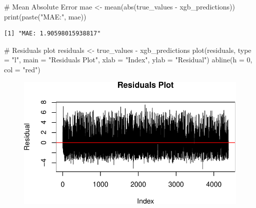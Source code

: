 \documentclass[
  super,
  preprint,
  3p]{elsarticle}
\newenvironment{Shaded}{\begin{snugshade}}{\end{snugshade}}
\newcommand{\AttributeTok}[1]{\textcolor[rgb]{0.40,0.45,0.13}{#1}}
\newcommand{\CommentTok}[1]{\textcolor[rgb]{0.37,0.37,0.37}{#1}}
\newcommand{\DecValTok}[1]{\textcolor[rgb]{0.68,0.00,0.00}{#1}}
\newcommand{\FunctionTok}[1]{\textcolor[rgb]{0.28,0.35,0.67}{#1}}
\newcommand{\NormalTok}[1]{\textcolor[rgb]{0.00,0.23,0.31}{#1}}
\newcommand{\OtherTok}[1]{\textcolor[rgb]{0.00,0.23,0.31}{#1}}
\newcommand{\SpecialCharTok}[1]{\textcolor[rgb]{0.37,0.37,0.37}{#1}}
\newcommand{\StringTok}[1]{\textcolor[rgb]{0.13,0.47,0.30}{#1}}
\begin{document}
\begin{Shaded}
\begin{Highlighting}[]
\CommentTok{\# Mean Absolute Error}
\NormalTok{mae }\OtherTok{\textless{}{-}} \FunctionTok{mean}\NormalTok{(}\FunctionTok{abs}\NormalTok{(true\_values }\SpecialCharTok{{-}}\NormalTok{ xgb\_predictions))}
\FunctionTok{print}\NormalTok{(}\FunctionTok{paste}\NormalTok{(}\StringTok{"MAE:"}\NormalTok{, mae))}
\end{Highlighting}
\end{Shaded}

\begin{verbatim}
[1] "MAE: 1.90598015938817"
\end{verbatim}

\begin{Shaded}
\begin{Highlighting}[]
\CommentTok{\# Residuals plot}
\NormalTok{residuals }\OtherTok{\textless{}{-}}\NormalTok{ true\_values }\SpecialCharTok{{-}}\NormalTok{ xgb\_predictions}
\FunctionTok{plot}\NormalTok{(residuals, }\AttributeTok{type =} \StringTok{"l"}\NormalTok{, }\AttributeTok{main =} \StringTok{"Residuals Plot"}\NormalTok{, }\AttributeTok{xlab =} \StringTok{"Index"}\NormalTok{, }\AttributeTok{ylab =} \StringTok{"Residual"}\NormalTok{)}
\FunctionTok{abline}\NormalTok{(}\AttributeTok{h =} \DecValTok{0}\NormalTok{, }\AttributeTok{col =} \StringTok{"red"}\NormalTok{)}
\end{Highlighting}
\end{Shaded}

\begin{figure}[H]

{\centering \includegraphics{project_report_files/figure-pdf/unnamed-chunk-58-1.pdf}

}

\end{figure}


  
\end{document}
